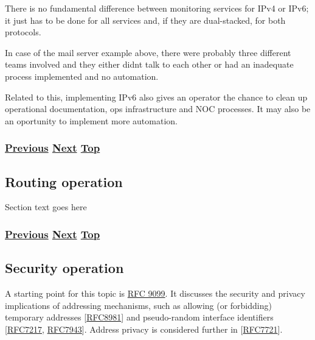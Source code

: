 \documentclass[
]{article}
\begin{document}
There is no fundamental difference between monitoring services for IPv4
or IPv6; it just has to be done for all services and, if they are
dual-stacked, for both protocols.

In case of the mail server example above, there were probably three
different teams involved and they either didn\textquotesingle t talk to
each other or had an inadequate process implemented and no automation.

Related to this, implementing IPv6 also gives an operator the chance to
clean up operational documentation, ops infrastructure and NOC
processes. It may also be an oportunity to implement more automation.

\subsubsection{\texorpdfstring{\hyperref[remote-configuration]{Previous}
\hyperref[routing-operation]{Next}
\hyperref[management-and-operations]{Top}}{Previous Next Top}}\label{previous-next-top-27}

\pagebreak

\subsection{Routing operation}\label{routing-operation}

Section text goes here

\subsubsection{\texorpdfstring{\hyperref[benchmarking-and-monitoring]{Previous}
\hyperref[security-operation]{Next}
\hyperref[management-and-operations]{Top}}{Previous Next Top}}\label{previous-next-top-28}

\pagebreak

\subsection{Security operation}\label{security-operation}

A starting point for this topic is
\href{https://www.rfc-editor.org/info/rfc9099}{RFC 9099}. It discusses
the security and privacy implications of addressing mechanisms, such as
allowing (or forbidding) temporary addresses
{[}\href{https://www.rfc-editor.org/info/rfc8981}{RFC8981}{]} and
pseudo-random interface identifiers
{[}\href{https://www.rfc-editor.org/info/rfc7217}{RFC7217},
\href{https://www.rfc-editor.org/info/rfc7943}{RFC7943}{]}. Address
privacy is considered further in
{[}\href{https://www.rfc-editor.org/info/rfc7721}{RFC7721}{]}.
\end{document}
